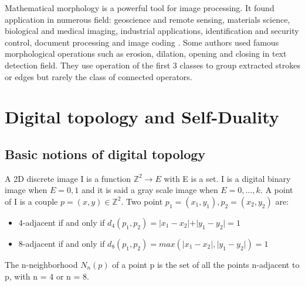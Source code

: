 \par Mathematical morphology is a powerful tool for image processing. It found application in numerous field: geoscience and remote sensing, materials science, biological and medical imaging, industrial applications, identification and security control, document processing and image coding \cite{Soille:2003:MIA:773286}. Some authors used famous morphological operations such as erosion, dilation, opening and closing in text detection field. They use operation of the first 3 classes to group extracted strokes\cite{Zhang.2015.Neurocomputing} or edges \cite{Ye.2003.ICICS} \cite{Pillai.2013.ICCPCT} but rarely the class of connected operators. 

\section{Digital topology and Self-Duality}
\subsection{Basic notions of digital topology}
\par
A 2D discrete image I is a function $ \mathbb{Z}^2 \rightarrow E$ with E is a set. I is a digital binary image when $E = {0,1}$ and it is said a gray scale image when $E = {0, \dots, k}$. A point of I is a couple $p = (x,y) \in \mathbb{Z}^2$. Two point $p_1 =(x_1,y_1),p_2=(x_2,y_2)$ are:
\begin{itemize}
\item 4-adjacent if and only if $d_4 (p_1,p_2) =\vert x_1 - x_2 \vert + \vert y_1 - y_2 \vert = 1 $
\item 8-adjacent if and only if $d_8 (p_1,p_2) =max (\vert x_1 - x_2 \vert , \vert y_1 - y_2 \vert) = 1 $
\end{itemize}
\par
The n-neighborhood $N_n (p)$ of a point p is the set of all the points n-adjacent to p, with n = 4 or n = 8. 
